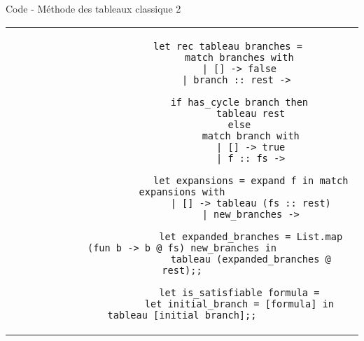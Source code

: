 \documentclass[]{beamer}
\begin{document}
\begin{frame}[fragile]{Code - Méthode des tableaux classique 2}
    \begin{center}
        \begin{tabular}{c}
            \begin{lstlisting}
                let rec tableau branches =
                    match branches with
                    | [] -> false
                    | branch :: rest -> 

                    if has_cycle branch then
                        tableau rest
                    else
                        match branch with
                        | [] -> true
                        | f :: fs ->

                        let expansions = expand f in match expansions with
                        | [] -> tableau (fs :: rest)
                        | new_branches ->
                        
                        let expanded_branches = List.map (fun b -> b @ fs) new_branches in
                        tableau (expanded_branches @ rest);;

                    let is_satisfiable formula =
                    let initial_branch = [formula] in tableau [initial_branch];;
            \end{lstlisting}
        \end{tabular}
    \end{center}
\end{frame}
\end{document}
